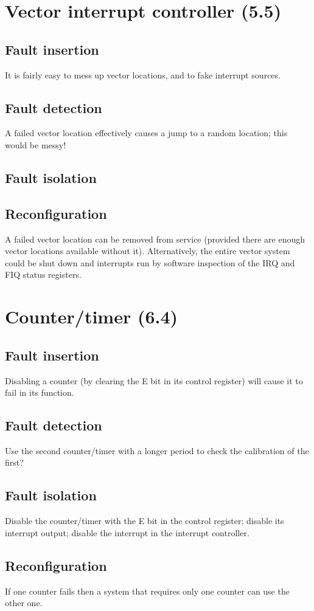 \documentclass[oneside, a4paper, 11pt]{memoir}
\begin{document}
\section{Vector interrupt controller (5.5)}
\subsection*{Fault insertion}
It is fairly easy to mess up vector locations, and to fake interrupt sources.
\subsection*{Fault detection}
A failed vector location effectively causes a jump to a random location; this would be messy!
\subsection*{Fault isolation}
\subsection*{Reconfiguration}
A failed vector location can be removed from service (provided there are enough vector locations
available without it). Alternatively, the entire vector system could be shut down and interrupts run
by software inspection of the IRQ and FIQ status registers.

\section{Counter/timer (6.4)}
\subsection*{Fault insertion}
Disabling a counter (by clearing the E bit in its control register) will cause it to fail in its function.
\subsection*{Fault detection}
Use the second counter/timer with a longer period to check the calibration of the first?
\subsection*{Fault isolation}
Disable the counter/timer with the E bit in the control register; disable its interrupt output; disable
the interrupt in the interrupt controller.
\subsection*{Reconfiguration}
If one counter fails then a system that requires only one counter can use the other one.
\end{document}
